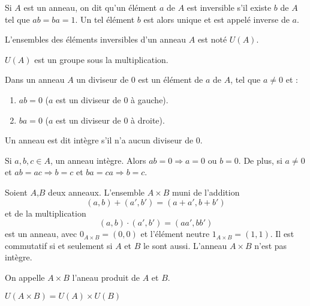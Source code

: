 \documentclass[12pt,a4paper]{article}
\begin{document}
\begin{flushleft}
\begin{mydef}
Si $A$ est un anneau, on dit qu'un élément $a$ de $A$ est inversible s'il existe $b$ de $A$ tel que $ab=ba=1$. Un tel élément $b$ est alors unique et est appelé inverse de $a$.
\end{mydef}

\begin{mydef}
L'ensembles des éléments inversibles d'un anneau $A$ est noté $U(A)$. 
\end{mydef}

\begin{prop}
$U(A)$ est un groupe sous la multiplication.
\end{prop}

\begin{mydef}
Dans un anneau $A$ un diviseur de $0$ est un élément de $a$ de $A$, tel que $a \neq 0$ et :
\begin{enumerate}
\item $ab = 0$ ($a$ est un diviseur de $0$ à gauche).
\item $ba = 0$ ($a$ est un diviseur de $0$ à droite).
\end{enumerate}
\end{mydef}

\begin{mydef}
Un anneau est dit intègre s'il n'a aucun diviseur de $0$.
\end{mydef}

\begin{prop}
Si $a,b,c \in A$, un anneau intègre. Alors $ab = 0 \Rightarrow a=0$ ou $b=0$. De plus, si $a \neq 0$ et $ab = ac \Rightarrow b=c$ et $ba = ca \Rightarrow b = c.$
\end{prop}

\begin{prop}
Soient $A$,$B$ deux anneaux. L'ensemble $A \times B$ muni de l'addition $$ (a,b) + (a',b') = (a+a',b+b')$$ et de la multiplication $$(a,b) \cdot (a',b') = (aa',bb')$$ est un anneau, avec $0_{A \times B} = (0,0)$ et l'élément neutre $1_{A \times B} = (1,1)$. Il est commutatif si et seulement si $A$ et $B$ le sont aussi. L'anneau $A \times B$ n'est pas intègre.
\end{prop}

\begin{mydef}
On appelle $A \times B$ l'aneau produit de $A$ et $B$.
\end{mydef}

\begin{prop} 
$U(A \times B) = U(A) \times U(B) $
\end{prop}


\end{flushleft}
\end{document}
